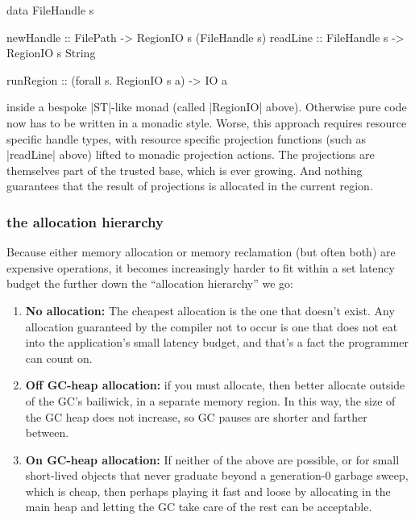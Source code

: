 \documentclass[11pt]{article}
\begin{document}
\begin{code}
data FileHandle s

newHandle :: FilePath -> RegionIO s (FileHandle s)
readLine :: FileHandle s -> RegionIO s String

runRegion :: (forall s. RegionIO s a) -> IO a
\end{code}

inside a bespoke |ST|-like monad (called |RegionIO| above). Otherwise
pure code now has to be written in a monadic style. Worse, this
approach requires resource specific handle types, with resource
specific projection functions (such as |readLine| above) lifted to
monadic projection actions. The projections are themselves part of the
trusted base, which is ever growing. And nothing guarantees that the
result of projections is allocated in the current region.

\subsubsection{the allocation hierarchy}

Because either memory allocation or memory reclamation (but often
both) are expensive operations, it becomes increasingly harder to fit
within a set latency budget the further down the ``allocation
hierarchy'' we go:
\begin{enumerate}
\item {\bf No allocation:} The cheapest allocation is the one that
  doesn't exist. Any allocation guaranteed by the compiler not to
  occur is one that does not eat into the application's small latency
  budget, and that's a fact the programmer can count on.
\item {\bf Off GC-heap allocation:} if you must allocate, then better
  allocate outside of the GC's bailiwick, in a separate memory region.
  In this way, the size of the GC heap does not increase, so GC pauses
  are shorter and farther between.
\item {\bf On GC-heap allocation:} If neither of the above are
  possible, or for small short-lived objects that never graduate
  beyond a generation-0 garbage sweep, which is cheap, then perhaps
  playing it fast and loose by allocating in the main heap and letting
  the GC take care of the rest can be acceptable.
\end{enumerate}
\end{document}
